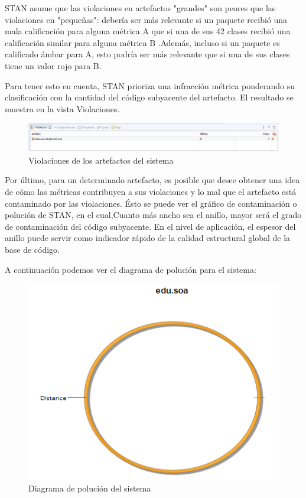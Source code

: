 STAN asume que las violaciones en artefactos "grandes" son peores que las violaciones en "pequeñas": debería ser más relevante si un paquete recibió una mala calificación para alguna métrica A que si una de sus 42 clases recibió una calificación similar para alguna métrica B .Además, incluso si un paquete es calificado ámbar para A, esto podría ser más relevante que si una de sus clases tiene un valor rojo para B\cite{Pw10V&P}.

Para tener esto en cuenta, STAN prioriza una infracción métrica ponderando su clasificación con la cantidad del código subyacente del artefacto. El resultado se muestra en la vista Violaciones.

\begin{figure}[H]
	\centering
	\includegraphics[width=0.8\linewidth]{parte2/imgs/Metricas/violaciones}
	\caption{Violaciones de los artefactos del sistema}
	\label{fig:violaciones}
\end{figure}

Por último, para un determinado artefacto, es posible que desee obtener una idea de cómo las métricas contribuyen a sus violaciones y lo mal que el artefacto está contaminado por las violaciones. Ésto se puede ver el gráfico de contaminación o polución de STAN, en el cual,Cuanto más ancho sea el anillo, mayor será el grado de contaminación del código subyacente. En el nivel de aplicación, el espesor del anillo puede servir como indicador rápido de la calidad estructural global de la base de código\cite{Pw10V&P}.

A continuación podemos ver el diagrama de polución para el sistema: 

\begin{figure}[H]
	\centering
	\includegraphics[width=0.6\linewidth]{parte2/imgs/Metricas/diagramaPolucion}
	\caption{Diagrama de polución del sistema}
	\label{fig:polucion}
\end{figure}

